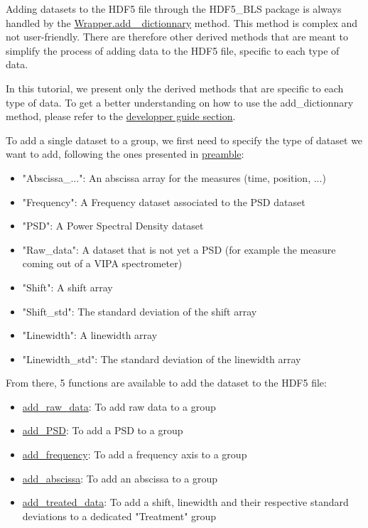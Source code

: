 Adding datasets to the HDF5 file through the HDF5\_BLS package is always handled by the \hyperref[subsec:wrapper.add_dictionnary]{Wrapper.add\_ dictionnary} method. This method is complex and not user-friendly. There are therefore other derived methods that are meant to simplify the process of adding data to the HDF5 file, specific to each type of data.

In this tutorial, we present only the derived methods that are specific to each type of data. To get a better understanding on how to use the add\_dictionnary method, please refer to the \hyperref[subsec:wrapper.add_dictionnary]{developper guide section}.

To add a single dataset to a group, we first need to specify the type of dataset we want to add, following the ones presented in \hyperref[subsec:preamble.file_structure.complete_structure]{preamble}:
\begin{itemize}
    \item "Abscissa\_...": An abscissa array for the measures (time, position, ...)
    \item "Frequency": A Frequency dataset associated to the PSD dataset
    \item "PSD": A Power Spectral Density dataset
    \item "Raw\_data": A dataset that is not yet a PSD (for example the measure coming out of a VIPA spectrometer)
    \item "Shift": A shift array
    \item "Shift\_std": The standard deviation of the shift array
    \item "Linewidth": A linewidth array
    \item "Linewidth\_std": The standard deviation of the linewidth array
\end{itemize}

From there, 5 functions are available to add the dataset to the HDF5 file:
\begin{itemize}
    \item \hyperref[subsec:wrapper.add_raw_data]{add\_raw\_data}: To add raw data to a group
    \item \hyperref[subsec:wrapper.add_psd]{add\_PSD}: To add a PSD to a group
    \item \hyperref[subsec:wrapper.add_frequency]{add\_frequency}: To add a frequency axis to a group
    \item \hyperref[subsec:wrapper.add_abscissa]{add\_abscissa}: To add an abscissa to a group
    \item \hyperref[subsec:wrapper.add_treated_data]{add\_treated\_data}: To add a shift, linewidth and their respective standard deviations to a dedicated "Treatment" group
\end{itemize}

